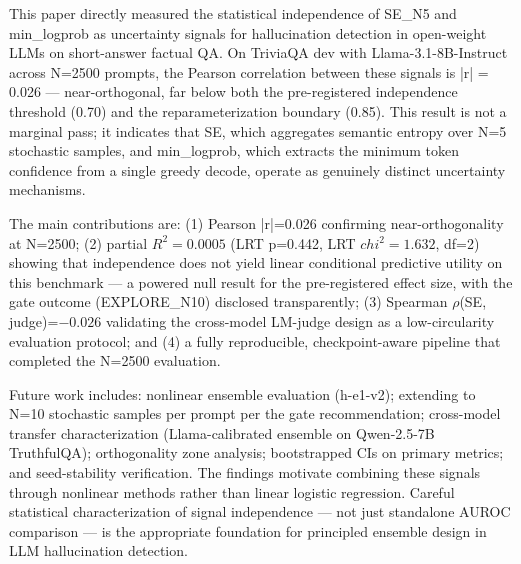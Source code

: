 
This paper directly measured the statistical independence of SE\_N5 and min\_logprob as uncertainty signals for hallucination detection in open-weight LLMs on short-answer factual QA. On TriviaQA dev with Llama-3.1-8B-Instruct across N=2500 prompts, the Pearson correlation between these signals is |r| = 0.026 --- near-orthogonal, far below both the pre-registered independence threshold (0.70) and the reparameterization boundary (0.85). This result is not a marginal pass; it indicates that SE, which aggregates semantic entropy over N=5 stochastic samples, and min\_logprob, which extracts the minimum token confidence from a single greedy decode, operate as genuinely distinct uncertainty mechanisms.

The main contributions are: (1) Pearson |r|=0.026 confirming near-orthogonality at N=2500; (2) partial $R^{2}=0.0005$ (LRT p=0.442, LRT $chi^{2}=1.632$, df=2) showing that independence does not yield linear conditional predictive utility on this benchmark --- a powered null result for the pre-registered effect size, with the gate outcome (EXPLORE\_N10) disclosed transparently; (3) Spearman $\rho$(SE, judge)=$-0.026$ validating the cross-model LM-judge design as a low-circularity evaluation protocol; and (4) a fully reproducible, checkpoint-aware pipeline that completed the N=2500 evaluation.

Future work includes: nonlinear ensemble evaluation (h-e1-v2); extending to N=10 stochastic samples per prompt per the gate recommendation; cross-model transfer characterization (Llama-calibrated ensemble on Qwen-2.5-7B TruthfulQA); orthogonality zone analysis; bootstrapped CIs on primary metrics; and seed-stability verification. The findings motivate combining these signals through nonlinear methods rather than linear logistic regression. Careful statistical characterization of signal independence --- not just standalone AUROC comparison --- is the appropriate foundation for principled ensemble design in LLM hallucination detection.

